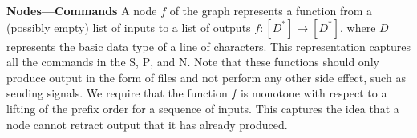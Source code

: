 \documentclass[sigplan, review, screen, anonymous]{acmart}
\newcommand{\heading}[1]{\vspace{4pt}\noindent\textbf{#1}\enspace}
\newcommand{\tcn}[1]{\mbox{\textcircled{\scriptsize #1}}}
\newcommand{\tsta}{\tcn{\textsc{S}}\xspace}
\newcommand{\tpur}{\tcn{\textsc{P}}\xspace}
\newcommand{\tnpu}{\tcn{\textsc{N}}\xspace}
\newcommand{\kk}[1]{[{\color{magenta}kk: #1}]}
\newcommand{\km}[1]{[{\color{blue}km: #1}]}
\newcommand{\tr}[1]{} %
\newcommand{\kstar}{^{\textstyle *}}
\begin{document}


\heading{Nodes---Commands}
A node $f$ of the graph represents a function from a (possibly empty)
list of inputs
to a list of outputs
$f : [D\kstar] \to [D\kstar]$, where $D$ represents the basic data
type of a line of characters.
This representation captures all the commands in
the \tsta, \tpur, and \tnpu. Note that these functions should only produce
output in the form of files and not perform any other side effect,
such as sending signals.  We require that the function $f$ is monotone
with respect to a lifting of the prefix order for a sequence of inputs.
This captures the idea that a node cannot retract output that it has
already produced.
\end{document}
